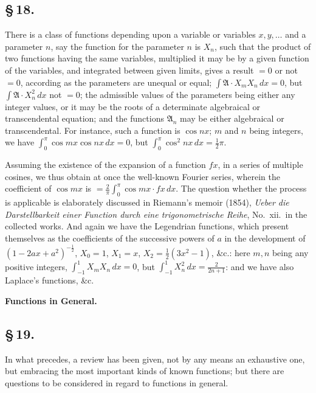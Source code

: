 \documentclass[11pt,a4paper]{book}
\begin{document}
\subsection*{\S\,18.}

There is a class of functions depending upon a variable or variables $x, y, \ldots$ and a parameter $n$, say the function for the parameter $n$ is $X_{n}$, such that the product of two functions having the same variables, multiplied it may be by a given function of the variables, and integrated between given limits, gives a result $= 0$ or not $= 0$, according as the parameters are unequal or equal; $\int \mathfrak{A} \cdot X_{m}X_{n}\,dx = 0$, but $\int \mathfrak{A} \cdot X_{n}^{2}\,dx$ not $= 0$; the admissible values of the parameters being either any integer values, or it may be the roots of a determinate algebraical or transcendental equation; and the functions $\mathfrak{A}_{n}$ may be either algebraical or transcendental. For instance, such a function is $\cos nx$; $m$ and $n$ being integers, we have $\int_{0}^{\pi}\cos mx \cos nx\,dx = 0$, but $\int_{0}^{\pi}\cos^{2}nx\,dx = \frac{1}{2}\pi$.

Assuming the existence of the expansion of a function $fx$, in a series of multiple cosines, we thus obtain at once the well-known Fourier series, wherein the coefficient of $\cos mx$ is $= \frac{2}{\pi}\int_{0}^{\pi}\cos mx \cdot fx\,dx$. The question whether the process is applicable is elaborately discussed in Riemann's memoir (1854), \textit{Ueber die Darstellbarkeit einer Function durch eine trigonometrische Reihe}, No.~xii.\ in the collected works. And again we have the Legendrian functions, which present themselves as the coefficients of the successive powers of $a$ in the development of $(1 - 2ax + a^{2})^{-\frac{1}{2}}$, $X_{0} = 1$, $X_{1} = x$, $X_{2} = \frac{1}{2}(3x^{2} - 1)$, \&c.: here $m, n$ being any positive integers, $\int_{-1}^{1}X_{m}X_{n}\,dx = 0$, but $\int_{-1}^{1}X_{n}^{2}\,dx = \frac{2}{2n + 1}$: and we have also Laplace's functions, \&c.

\smallskip
\begin{center}\textbf{Functions in General.}\end{center}

\subsection*{\S\,19.}

In what precedes, a review has been given, not by any means an exhaustive one, but embracing the most important kinds of known functions; but there are questions to be considered in regard to functions in general.
\end{document}

